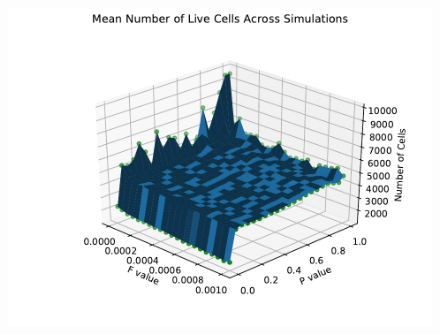 \documentclass{article}
\begin{document}
\begin{figure}[H]
\centering
\includegraphics[scale=0.6]{Live Mean 3D 2.pdf}
\label{fig:livemean3D}
\end{figure}
\end{document}
